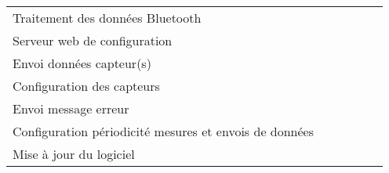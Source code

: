 \begin{center}
\begin{longtable}{|m{6cm}|m{17mm}|m{17mm}|m{17mm}|m{17mm}|m{17mm}|}
& %

& %

& %

& %

\\\hline
Traitement des données Bluetooth
& %

& %

& %

& %

& %

\\\hline
Serveur web de configuration
& %

& %

& %

& %

& %

\\\hline
Envoi données capteur(s)
& %

& %

& %

& %

& %

\\\hline
Configuration des capteurs
& %

& %

& %

& %

& %

\\\hline
Envoi message erreur
& %

& %

& %

& %

& %

\\\hline
Configuration périodicité mesures et envois de données
& %

& %

& %

& %

& %

\\\hline
Mise à jour du logiciel
& %

& %

& %

& %

& %

\\\hline
\end{longtable}
\end{center}
